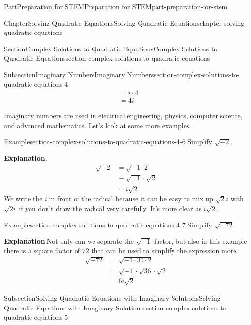 \documentclass[twoside,10pt,]{book}
\newcommand{\blocktitlefont}{\relax}
\numberwithin{equation}{section}
\newcommand{\amp}{&}
\begin{document}
\begin{partptx}{Part}{Preparation for STEM}{}{Preparation for STEM}{}{}{part-preparation-for-stem}
\begin{chapterptx}{Chapter}{Solving Quadratic Equations}{}{Solving Quadratic Equations}{}{}{chapter-solving-quadratic-equations}
\begin{sectionptx}{Section}{Complex Solutions to Quadratic Equations}{}{Complex Solutions to Quadratic Equations}{}{}{section-complex-solutions-to-quadratic-equations}
\begin{subsectionptx}{Subsection}{Imaginary Numbers}{}{Imaginary Numbers}{}{}{section-complex-solutions-to-quadratic-equations-4}
\begin{align*}
\amp=i\cdot4\\
\amp=4i
\end{align*}
%
\par
Imaginary numbers are used in electrical engineering, physics, computer science, and advanced mathematics. Let's look at some more examples.%
\begin{example}{Example}{}{section-complex-solutions-to-quadratic-equations-4-6}%
Simplify \(\sqrt{-2}\).%
\par\smallskip%
{\makeatletter{}\makeatother\noindent\textbf{\blocktitlefont Explanation}.\hypertarget{section-complex-solutions-to-quadratic-equations-4-6-2}{}\quad{}%
\begin{align*}
\sqrt{-2}\amp=\sqrt{-1\cdot2}\\
\amp=\sqrt{-1}\cdot\sqrt{2}\\
\amp=i\sqrt{2}
\end{align*}
We write the \(i\) in front of the radical because it can be easy to mix up \(\sqrt{2}i\) with \(\sqrt{2i}\) if you don't draw the radical very carefully. It's more clear as \(i\sqrt{2}\).%
}\end{example}
\begin{example}{Example}{}{section-complex-solutions-to-quadratic-equations-4-7}%
Simplify \(\sqrt{-72}\).%
\par\smallskip%
{\makeatletter{}\makeatother\noindent\textbf{\blocktitlefont Explanation}.\hypertarget{section-complex-solutions-to-quadratic-equations-4-7-2}{}\quad{}Not only can we separate the \(\sqrt{-1}\) factor, but also in this example there is a square factor of \(72\) that can be used to simplify the expression more.%
\begin{align*}
\sqrt{-72}\amp=\sqrt{-1\cdot36\cdot2}\\
\amp=\sqrt{-1}\cdot\sqrt{36}\cdot\sqrt{2}\\
\amp=6i\sqrt{2}
\end{align*}
%
}\end{example}
\end{subsectionptx}
%
%
\typeout{************************************************}
\typeout{************************************************}
%
\begin{subsectionptx}{Subsection}{Solving Quadratic Equations with Imaginary Solutions}{}{Solving Quadratic Equations with Imaginary Solutions}{}{}{section-complex-solutions-to-quadratic-equations-5}

\end{subsectionptx}
\end{sectionptx}
\end{chapterptx}
\end{partptx}
\end{document}
